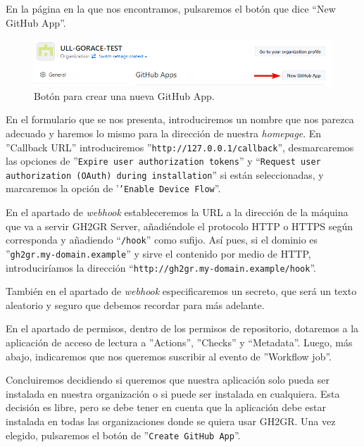 En la página en la que nos encontramos, pulsaremos el botón que dice ``New GitHub App''.

\begin{figure}[H]
    \centering
    \includegraphics[width=0.5\linewidth]{images/new-app-btn.png}
    \caption{Botón para crear una nueva GitHub App.}
\end{figure}

En el formulario que se nos presenta, introduciremos un nombre que nos parezca adecuado y haremos lo mismo para la dirección de nuestra \textit{homepage}. En ''Callback URL'' introduciremos ''{\tt http://127.0.0.1/callback}'', desmarcaremos las opciones de ''{\tt Expire user authorization tokens}'' y ``{\tt Request user authorization (OAuth) during installation}'' si están seleccionadas, y marcaremos la opción de '{\tt 'Enable Device Flow}''.

En el apartado de \textit{webhook} estableceremos la URL a la dirección de la máquina que va a servir GH2GR Server, añadiéndole el protocolo \acrshort{HTTP} o \acrshort{HTTPS} según corresponda y añadiendo ``{\tt /hook}'' como sufijo. Así pues, si el dominio es ''{\tt gh2gr.my-domain.example}'' y sirve el contenido por medio de \acrshort{HTTP}, introduciríamos la dirección ``{\tt http://gh2gr.my-domain.example/hook}''. 

También en el apartado de \textit{webhook} especificaremos un secreto, que será un texto aleatorio y seguro que debemos recordar para más adelante.

En el apartado de permisos, dentro de los permisos de repositorio, dotaremos a la aplicación de acceso de lectura a ''Actions'', ''Checks'' y ``Metadata''. Luego, más abajo, indicaremos que nos queremos suscribir al evento de ''Workflow job''.

Concluiremos decidiendo si queremos que nuestra aplicación solo pueda ser instalada en nuestra organización o si puede ser instalada en cualquiera. Esta decisión es libre, pero se debe tener en cuenta que la aplicación debe estar instalada en todas las organizaciones donde se quiera usar GH2GR. Una vez elegido, pulsaremos el botón de ''{\tt Create GitHub App}''.

